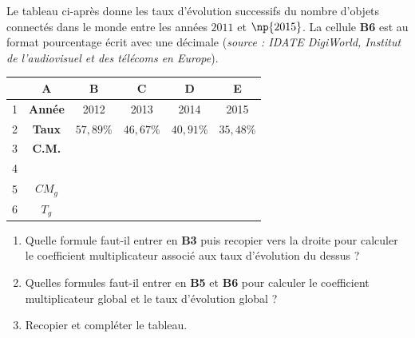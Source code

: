 \begin{exo}{}
	Le tableau ci-après donne les taux d'évolution successifs du nombre d'objets connectés dans le monde entre les années $2011$ et $\np{2015}$.
	La cellule \textbf{B6} est au format pourcentage écrit avec une décimale (\textit{source : IDATE DigiWorld, Institut de l'audiovisuel et des télécoms en Europe}).


	\begin{center}
		\def\arraystretch{1.5}
		\begin{tabular}{|c|c|c|c|c|c|}
			\hline
			                     & \cellcolor{gray!30}A & \cellcolor{gray!30}B  & \cellcolor{gray!30}C & \cellcolor{gray!30}D & \cellcolor{gray!30}E \\ \hline
			\cellcolor{gray!30}1 & \textbf{Année}       & 2012                  & 2013                 & 2014                 & 2015                 \\ \hline
			\cellcolor{gray!30}2 & \textbf{Taux}        & $57,89$\%             & $46,67$\%            & $40,91$\%            & $35,48$\%            \\ \hline
			\cellcolor{gray!30}3 & \textbf{C.M.}        &                       &                      &                      &                      \\ \hline
			\cellcolor{gray!30}4 &                      &                       &                      &                      &                      \\ \hline
			\cellcolor{gray!30}5 & $CM_g$               & \multicolumn{4}{l|}{}                                                                      \\ \hline
			\cellcolor{gray!30}6 & $T_g$                & \multicolumn{4}{l|}{}                                                                      \\ \hline
		\end{tabular}
	\end{center}


	\begin{enumerate}
		\item Quelle formule faut-il entrer en \textbf{B3} puis recopier vers la droite pour calculer le coefficient multiplicateur associé aux taux d'évolution du dessus ?
		\item Quelles formules faut-il entrer en \textbf{B5} et \textbf{B6} pour calculer le coefficient multiplicateur global et le taux d'évolution global ?
		\item Recopier et compléter le tableau.
	\end{enumerate}
\end{exo}

